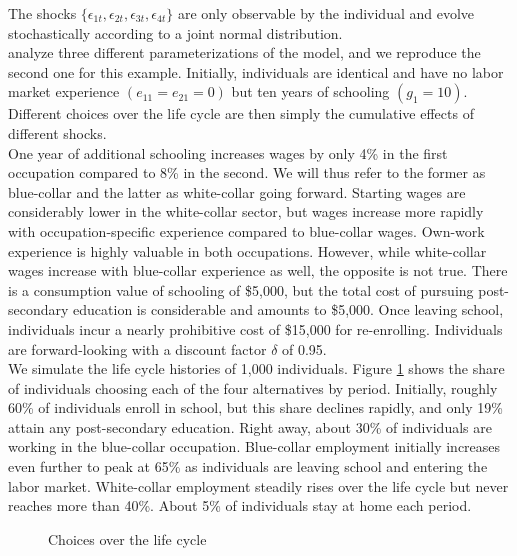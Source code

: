 \noindent The shocks $\{\epsilon_{1t},\epsilon_{2t},\epsilon_{3t},\epsilon_{4t}\}$ are only observable by the individual and evolve stochastically according to a joint normal distribution.\\

\noindent \citet{Keane.1994} analyze three different parameterizations of the model, and we reproduce the second one for this example. Initially, individuals are identical and have no labor market experience $(e_{11} = e_{21} = 0)$ but ten years of schooling $(g_1 = 10)$. Different choices over the life cycle are then simply the cumulative effects of different shocks.\\

\noindent One year of additional schooling increases wages by only 4\% in the first occupation compared to 8\% in the second. We will thus refer to the former as blue-collar and the latter as white-collar going forward. Starting wages are considerably lower in the white-collar sector, but wages increase more rapidly with occupation-specific experience compared to blue-collar wages. Own-work experience is highly valuable in both occupations. However, while white-collar wages increase with blue-collar experience as well, the opposite is not true. There is a consumption value of schooling of \$5,000, but the total cost of pursuing post-secondary education is considerable and amounts to \$5,000. Once leaving school, individuals incur a nearly prohibitive cost of \$15,000 for re-enrolling. Individuals are forward-looking with a discount factor $\delta$ of 0.95.\\

\noindent We simulate the life cycle histories of 1,000 individuals. Figure \ref{Choices over the life cycle} shows the share of individuals choosing each of the four alternatives by period. Initially, roughly 60\% of individuals enroll in school, but this share declines rapidly, and only 19\% attain any post-secondary education. Right away, about 30\% of individuals are working in the blue-collar occupation.  Blue-collar employment initially increases even further to peak at 65\% as individuals are leaving school and entering the labor market. White-collar employment steadily rises over the life cycle but never reaches more than 40\%. About 5\% of individuals stay at home each period.

\begin{figure}[ht!]\centering
\caption{Choices over the life cycle}\label{Choices over the life cycle}
\end{figure}\FloatBarrier

